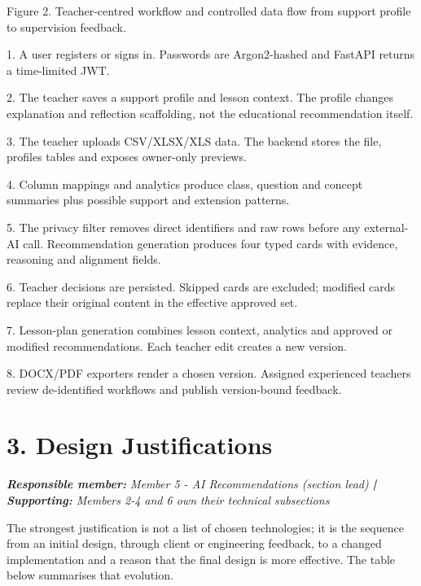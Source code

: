 \documentclass[11pt,a4paper]{article}
\begin{document}
Figure 2. Teacher-centred workflow and controlled data flow from support profile to supervision feedback.\par

1.  A user registers or signs in. Passwords are Argon2-hashed and FastAPI returns a time-limited JWT.\par

2.  The teacher saves a support profile and lesson context. The profile changes explanation and reflection scaffolding, not the educational recommendation itself.\par

3.  The teacher uploads CSV/XLSX/XLS data. The backend stores the file, profiles tables and exposes owner-only previews.\par

4.  Column mappings and analytics produce class, question and concept summaries plus possible support and extension patterns.\par

5.  The privacy filter removes direct identifiers and raw rows before any external-AI call. Recommendation generation produces four typed cards with evidence, reasoning and alignment fields.\par

6.  Teacher decisions are persisted. Skipped cards are excluded; modified cards replace their original content in the effective approved set.\par

7.  Lesson-plan generation combines lesson context, analytics and approved or modified recommendations. Each teacher edit creates a new version.\par

8.  DOCX/PDF exporters render a chosen version. Assigned experienced teachers review de-identified workflows and publish version-bound feedback.\par

\section*{3. Design Justifications}


\noindent\textit{\textbf{Responsible member: }Member 5 - AI Recommendations (section lead)\textbf{ | Supporting: }Members 2-4 and 6 own their technical subsections}\par

The strongest justification is not a list of chosen technologies; it is the sequence from an initial design, through client or engineering feedback, to a changed implementation and a reason that the final design is more effective. The table below summarises that evolution.\par
\end{document}
